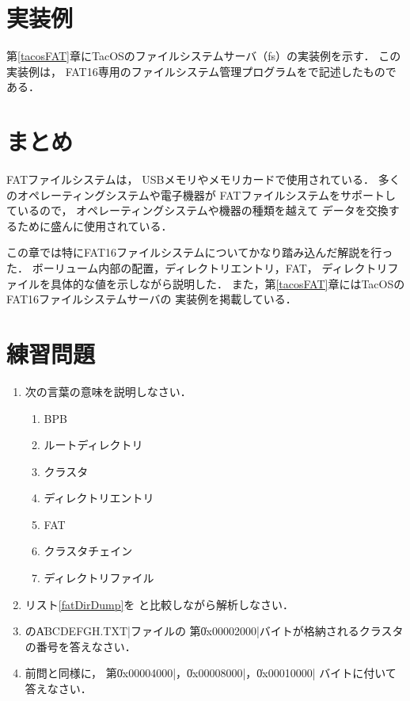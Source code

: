 \section{実装例}
第\ref{tacosFAT}章にTacOSのファイルシステムサーバ（fs）の実装例を示す．
この実装例は，
FAT16専用のファイルシステム管理プログラムを{\cmml}で記述したものである．

\section{まとめ}
FATファイルシステムは，
USBメモリやメモリカードで使用されている．
多くのオペレーティングシステムや電子機器が
FATファイルシステムをサポートしているので，
オペレーティングシステムや機器の種類を越えて
データを交換するために盛んに使用されている．

この章では特にFAT16ファイルシステムについてかなり踏み込んだ解説を行った．
ボーリューム内部の配置，ディレクトリエントリ，FAT，
ディレクトリファイルを具体的な値を示しながら説明した．
また，第\ref{tacosFAT}章にはTacOSのFAT16ファイルシステムサーバの
実装例を掲載している．

\section*{練習問題}
\begin{enumerate}
  \renewcommand{\labelenumi}{\ttfamily\arabic{chapter}.\arabic{enumi}}
  \setlength{\leftskip}{1em}
\item 次の言葉の意味を説明しなさい．
  \begin{enumerate}
  \item BPB
  \item ルートディレクトリ
  \item クラスタ
  \item ディレクトリエントリ
  \item FAT
  \item クラスタチェイン
  \item ディレクトリファイル
  \end{enumerate}
\item リスト\ref{fatDirDump}を
  と比較しながら解析しなさい．
\item {}の\|ABCDEFGH.TXT|ファイルの
  第\|0x00002000|バイトが格納されるクラスタの番号を答えなさい．
\item 前問と同様に，
  第\|0x00004000|，\|0x00008000|，\|0x00010000|
  バイトに付いて答えなさい．
\end{enumerate}
